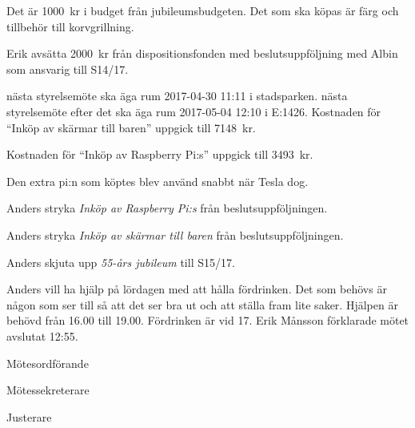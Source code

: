 \documentclass[10pt]{article}
\def\mo{Erik Månsson}
\def\ms{Johan Karlberg}
\def\ji{Niklas Gustafson}
\begin{document}
\begin{paragrafer}
Det är \SI{1000}{kr} i budget från jubileumsbudgeten. Det som ska köpas är färg och tillbehör till korvgrillning.

Erik \ypa avsätta \SI{2000}{kr} från dispositionsfonden med beslutsuppföljning med Albin som ansvarig till S14/17.

\Mbaby
{}
{\Mba}nästa styrelsemöte ska äga rum 2017-04-30 11:11 i stadsparken.
{\Mba}nästa styrelsemöte efter det ska äga rum 2017-05-04 12:10 i E:1426.
Kostnaden för ``Inköp av skärmar till baren'' uppgick till \SI{7148}{kr}.

Kostnaden för ``Inköp av Raspberry Pi:s'' uppgick till \SI{3493}{kr}.

Den extra pi:n som köptes blev använd snabbt när Tesla dog.

Anders \ypa stryka \emph{Inköp av Raspberry Pi:s} från beslutsuppföljningen.

\Mbaby

Anders \ypa stryka \emph{Inköp av skärmar till baren} från beslutsuppföljningen.

\Mbaby

Anders \ypa skjuta upp \emph{55-års jubileum} till S15/17.

\Mbaby

Anders vill ha hjälp på lördagen med att hålla fördrinken. Det som behövs är någon som ser till så att det ser bra ut och att ställa fram lite saker. Hjälpen är behövd från 16.00 till 19.00. Fördrinken är vid 17.
{\mo} förklarade mötet avslutat 12:55.

\end{paragrafer}

\hidesignfoot
\begin{signatures}{3}
\signature{\mo}{Mötesordförande}
\signature{\ms}{Mötessekreterare}
\signature{\ji}{Justerare}
\end{signatures}
\end{document}
